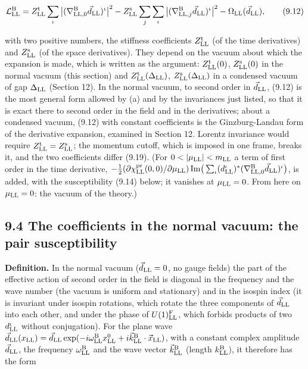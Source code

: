 \documentclass[
  10pt,
]{article}
\begin{document}
\[\mathcal L^{\rm B}_{\rm LL}=Z^{\rm t}_{\rm LL}\sum_\iota\big\lvert(\nabla^{\rm B}_{{\rm LL},0}\vec d_{\rm LL})^\iota\big\rvert^2-Z^{\rm s}_{\rm LL}\sum_j\sum_\iota\big\lvert(\nabla^{\rm B}_{{\rm LL},j}\vec d_{\rm LL})^\iota\big\rvert^2-\Omega_{\rm LL}(\vec d_{\rm LL}),\tag{9.12}\]

with two positive numbers, the stiffness coefficients
\(Z^{\rm t}_{\rm LL}\) (of the time derivatives) and
\(Z^{\rm s}_{\rm LL}\) (of the space derivatives). They depend on the
vacuum about which the expansion is made, which is written as the
argument: \(Z^{\rm t}_{\rm LL}(0)\), \(Z^{\rm s}_{\rm LL}(0)\) in the
normal vacuum (this section) and
\(Z^{\rm t}_{\rm LL}(\Delta_{\rm LL})\),
\(Z^{\rm s}_{\rm LL}(\Delta_{\rm LL})\) in a condensed vacuum of gap
\(\Delta_{\rm LL}\) (Section 12). In the normal vacuum, to second order
in \(\vec d_{\rm LL}\), (9.12) is the most general form allowed by (a)
and by the invariances just listed, so that it is exact there to second
order in the field and in the derivatives; about a condensed vacuum,
(9.12) with constant coefficients is the Ginzburg-Landau form of the
derivative expansion, examined in Section 12. Lorentz invariance would
require \(Z^{\rm t}_{\rm LL}=Z^{\rm s}_{\rm LL}\); the momentum cutoff,
which is imposed in one frame, breaks it, and the two coefficients
differ (9.19). (For \(0<\lvert\mu_{\rm LL}\rvert<m_{\rm LL}\) a term of
first order in the time derivative,
\(-\tfrac12(\partial\chi^{\rm pr}_{\rm LL}(0,0)/\partial\mu_{\rm LL})\,{\rm Im}\big(\sum_\iota(d^\iota_{\rm LL})^*(\nabla^{\rm B}_{{\rm LL},0}\vec d_{\rm LL})^\iota\big)\),
is added, with the susceptibility (9.14) below; it vanishes at
\(\mu_{\rm LL}=0\). From here on \(\mu_{\rm LL}=0\): the vacuum of the
theory.)

\hypertarget{the-coefficients-in-the-normal-vacuum-the-pair-susceptibility}{%
\subsection{9.4 The coefficients in the normal vacuum: the pair
susceptibility}\label{the-coefficients-in-the-normal-vacuum-the-pair-susceptibility}}

\textbf{Definition.} In the normal vacuum (\(\vec d_{\rm LL}=0\), no
gauge fields) the part of the effective action of second order in the
field is diagonal in the frequency and the wave number (the vacuum is
uniform and stationary) and in the isospin index (it is invariant under
isospin rotations, which rotate the three components of
\(\vec d_{\rm LL}\) into each other, and under the phase of
\(U(1)^{\rm F}_{\rm LL}\), which forbids products of two
\(d^\iota_{\rm LL}\) without conjugation). For the plane wave
\(\vec d_{\rm LL}(x_{\rm LL})=\vec d_{\rm LL}\exp(-i\omega^{\rm B}_{\rm LL}x^0_{\rm LL}+i\vec k^{\rm B}_{\rm LL}\cdot\vec x_{\rm LL})\),
with a constant complex amplitude \(\vec d_{\rm LL}\), the frequency
\(\omega^{\rm B}_{\rm LL}\) and the wave vector
\(\vec k^{\rm B}_{\rm LL}\) (length \(k^{\rm B}_{\rm LL}\)), it
therefore has the form
\end{document}
